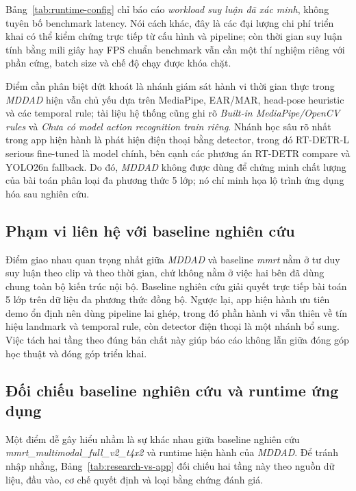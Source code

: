 \documentclass[conference,a4paper]{IEEEtran}
\begin{document}
Bảng~\ref{tab:runtime-config} chỉ báo cáo \textit{workload suy luận đã xác minh}, không tuyên bố benchmark latency. Nói cách khác, đây là các đại lượng chi phí triển khai có thể kiểm chứng trực tiếp từ cấu hình và pipeline; còn thời gian suy luận tính bằng mili giây hay FPS chuẩn benchmark vẫn cần một thí nghiệm riêng với phần cứng, batch size và chế độ chạy được khóa chặt.

Điểm cần phân biệt dứt khoát là nhánh giám sát hành vi thời gian thực trong \textit{MDDAD} hiện vẫn chủ yếu dựa trên MediaPipe, EAR/MAR, head-pose heuristic và các temporal rule; tài liệu hệ thống cũng ghi rõ \textit{Built-in MediaPipe/OpenCV rules} và \textit{Chưa có model action recognition train riêng}. Nhánh học sâu rõ nhất trong app hiện hành là phát hiện điện thoại bằng detector, trong đó RT-DETR-L serious fine-tuned là model chính, bên cạnh các phương án RT-DETR compare và YOLO26n fallback. Do đó, \textit{MDDAD} không được dùng để chứng minh chất lượng của bài toán phân loại đa phương thức 5 lớp; nó chỉ minh họa lộ trình ứng dụng hóa sau nghiên cứu.

\subsection{Phạm vi liên hệ với baseline nghiên cứu}
Điểm giao nhau quan trọng nhất giữa \textit{MDDAD} và baseline \textit{mmrt} nằm ở tư duy suy luận theo clip và theo thời gian, chứ không nằm ở việc hai bên đã dùng chung toàn bộ kiến trúc nội bộ. Baseline nghiên cứu giải quyết trực tiếp bài toán 5 lớp trên dữ liệu đa phương thức đồng bộ. Ngược lại, app hiện hành ưu tiên demo ổn định nên dùng pipeline lai ghép, trong đó phần hành vi vẫn thiên về tín hiệu landmark và temporal rule, còn detector điện thoại là một nhánh bổ sung. Việc tách hai tầng theo đúng bản chất này giúp báo cáo không lẫn giữa đóng góp học thuật và đóng góp triển khai.

\subsection{Đối chiếu baseline nghiên cứu và runtime ứng dụng}
Một điểm dễ gây hiểu nhầm là sự khác nhau giữa baseline nghiên cứu \textit{mmrt\_multimodal\_full\_v2\_t4x2} và runtime hiện hành của \textit{MDDAD}. Để tránh nhập nhằng, Bảng~\ref{tab:research-vs-app} đối chiếu hai tầng này theo nguồn dữ liệu, đầu vào, cơ chế quyết định và loại bằng chứng đánh giá.
\end{document}
